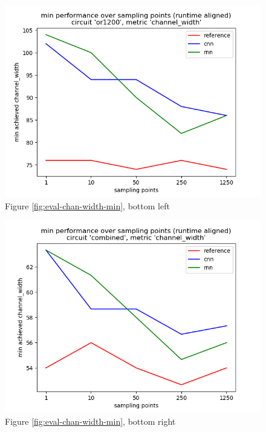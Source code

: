 \begin{figure}[H]
\includegraphics[width=\linewidth]{plots/eval-or1200-chan-width-min-full.png}
\caption{Figure \ref{fig:eval-chan-width-min}, bottom left}
\end{figure}

\begin{figure}[H]
\includegraphics[width=\linewidth]{plots/eval-combined-chan-width-min-full.png}
\caption{Figure \ref{fig:eval-chan-width-min}, bottom right}
\end{figure}

